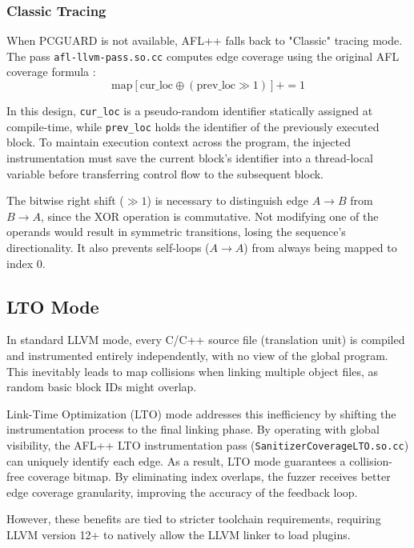 \subsubsection{Classic Tracing}

When PCGUARD is not available, AFL++ falls back to "Classic" tracing mode. The pass \texttt{afl-llvm-pass.so.cc} computes edge coverage using the original AFL coverage formula \cite{zalewski2014afltech}:
\[
    \text{map}[\text{cur\_loc} \oplus (\text{prev\_loc} \gg 1)] \mathrel{{+}{=}} 1
\]

In this design, \texttt{cur\_loc} is a pseudo-random identifier statically assigned at compile-time, while \texttt{prev\_loc} holds the identifier of the previously executed block. To maintain execution context across the program, the injected instrumentation must save the current block's identifier into a thread-local variable before transferring control flow to the subsequent block.

The bitwise right shift ($\gg 1$) is necessary to distinguish edge $A \rightarrow B$ from $B \rightarrow A$, since the XOR operation is commutative. Not modifying one of the operands would result in symmetric transitions, losing the sequence's directionality. It also prevents self-loops ($A \rightarrow A$) from always being mapped to index 0.

\subsection{LTO Mode}

In standard LLVM mode, every C/C++ source file (translation unit) is compiled and instrumented entirely independently, with no view of the global program. This inevitably leads to map collisions when linking multiple object files, as random basic block IDs might overlap.

Link-Time Optimization (LTO) mode addresses this inefficiency by shifting the instrumentation process to the final linking phase. By operating with global visibility, the AFL++ LTO instrumentation pass (\texttt{SanitizerCoverageLTO.so.cc}) can uniquely identify each edge. As a result, LTO mode guarantees a collision-free coverage bitmap. By eliminating index overlaps, the fuzzer receives better edge coverage granularity, improving the accuracy of the feedback loop.

However, these benefits are tied to stricter toolchain requirements, requiring LLVM version 12+ to natively allow the LLVM linker to load plugins.

